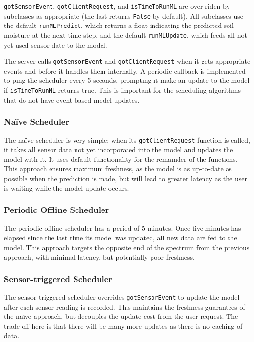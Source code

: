 \documentclass[a4paper]{acm_proc_article-sp}
\makeatletter
\newcommand{\Naive}{Na\"{i}ve\@\xspace}
\newcommand{\naive}{na\"{i}ve\@\xspace}
\makeatother
\begin{document}
\lstinline|gotSensorEvent|, \lstinline|gotClientRequest|, and \lstinline|isTimeToRunML| are over-riden by subclasses as appropriate (the last returns \lstinline|False| by default).  All subclasses use the default \lstinline|runMLPredict|, which returns a float indicating the predicted soil moisture at the next time step, and the default \lstinline|runMLUpdate|, which feeds all not-yet-used sensor date to the model.

The server calls \lstinline|gotSensorEvent| and \lstinline|gotClientRequest| when it gets appropriate events and before it handles them internally.  A periodic callback is implemented to ping the scheduler every 5 seconds, prompting it make an update to the model if \lstinline|isTimeToRunML| returns true.  This is important for the scheduling algorithms that do not have event-based model updates.

\subsubsection{\Naive Scheduler}

The \naive scheduler is very simple: when its \lstinline|gotClientRequest| function is called, it takes all sensor data not yet incorporated into the model and updates the model with it.  It uses default functionality for the remainder of the functions.  This approach ensures maximum freshness, as the model is as up-to-date as possible when the prediction is made, but will lead to greater latency as the user is waiting while the model update occurs.

\subsubsection{Periodic Offline Scheduler}

The periodic offline scheduler has a period of 5 minutes.  Once five minutes has elapsed since the last time its model was updated, all new data are fed to the model.  This approach targets the opposite end of the spectrum from the previous approach, with minimal latency, but potentially poor freshness.

\subsubsection{Sensor-triggered Scheduler}

The sensor-triggered scheduler overrides \lstinline|gotSensorEvent| to update the model after each sensor reading is recorded.  This maintains the freshness guarantees of the \naive approach, but decouples the update cost from the user request.  The trade-off here is that there will be many more updates as there is no caching of data.
\end{document}
